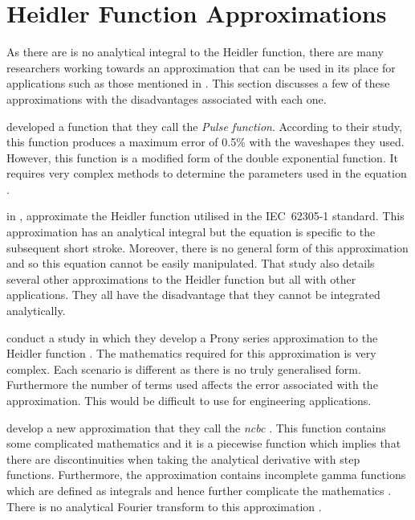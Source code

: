 
\section{Heidler Function Approximations}
\label{sec:background_approximations}
As there are is no analytical integral to the Heidler function, there are many researchers working towards an approximation that can be used in its place for applications such as those mentioned in . This section discusses a few of these approximations with the disadvantages associated with each one.

\citeauthor{ZhangFeizhouandLiuShanghe2002} developed a function that they call the \textit{Pulse function}. According to their study, this function produces a maximum error of 0.5\% with the waveshapes they used. However, this function is a modified form of the double exponential function. It requires very complex methods to determine the parameters used in the equation \cite{ZhangFeizhouandLiuShanghe2002}.

\citeauthor{Heidler2002} in \cite{Heidler2002}, approximate the Heidler function utilised in the IEC~62305-1 standard. This approximation has an analytical integral but the equation is specific to the subsequent short stroke. Moreover, there is no general form of this approximation and so this equation cannot be easily manipulated. That study also details several other approximations to the Heidler function but all with other applications. They all have the disadvantage that they cannot be integrated analytically.

\citeauthor{Delfino2012} conduct a study in which they develop a Prony series approximation to the Heidler function \cite{Delfino2012}. The mathematics required for this approximation is very complex. Each scenario is different as there is no truly generalised form. Furthermore the number of terms used affects the error associated with the approximation. This would be difficult to use for engineering applications.

\citeauthor{Javor2011} develop a new approximation that they call the \textit{\gls{ncbc}} \cite{Javor2011,Javor2012}. This function contains some complicated mathematics and it is a piecewise function which implies that there are discontinuities when taking the analytical derivative with step functions. Furthermore, the approximation contains incomplete gamma functions which are defined as integrals and hence further complicate the mathematics \cite{Gautschi:1979:CPI}. There is no analytical Fourier transform to this approximation \cite{Javor}.

